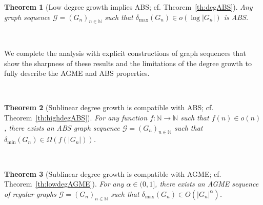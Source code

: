 \documentclass[a4paper,onecolumn,accepted=2024-12-14]{quantumarticle}
\theoremstyle{plain}
\newtheorem{result}{Theorem}
\newcommand{\cG}{{\mathcal G}}         %
\newcommand{\N}{\mathbb{N}} %
\begin{document}
\begin{result}[Low degree growth implies ABS; cf. Theorem~\ref{th:degABS}]
Any graph sequence $\cG=(G_n)_{n\in\N}$ such that $\delta_{\mathrm{max}}(G_n)\in o\left(\log|G_n|\right)$ is ABS.\label{thm:2}
\end{result}

\

We complete the analysis with explicit constructions of graph sequences that show the sharpness of these results and the limitations of the degree growth to fully describe the AGME and ABS properties.

\

\begin{result}[Sublinear degree growth is compatible with ABS; cf. Theorem~\ref{th:highdegABS}]

For any function $f\colon\mathbb{N}\to\mathbb{N}$ such that $f(n)\in o(n)$, there exists an ABS graph sequence $\mathcal{G}=(G_n)_{n\in\mathbb{N}}$ such that
$\delta_{\mathrm{min}}(G_n)\in\Omega(f(|G_n|))$.\label{thm:3}
\end{result}

\

\begin{result}[Sublinear degree growth is compatible with AGME; cf. Theorem~\ref{th:lowdegAGME}]
For any $\alpha\in(0,1]$, there exists an AGME sequence of regular graphs $\cG=(G_n)_{n\in\N}$ such that $\delta_{\mathrm{max}}(G_n)\in O(|G_n|^\alpha)$.\label{thm:4}
\end{result}

\
\end{document}
